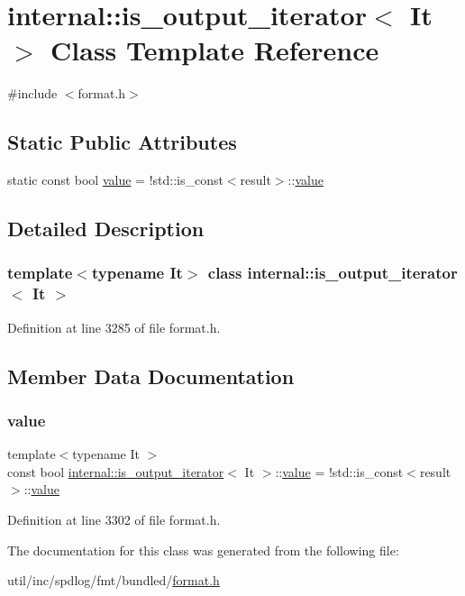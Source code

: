 \hypertarget{classinternal_1_1is__output__iterator}{}\section{internal\+:\+:is\+\_\+output\+\_\+iterator$<$ It $>$ Class Template Reference}
\label{classinternal_1_1is__output__iterator}


{\ttfamily \#include $<$format.\+h$>$}

\subsection*{Static Public Attributes}
\begin{DoxyCompactItemize}
\item 
static const bool \hyperlink{classinternal_1_1is__output__iterator_a2d666d72beb4bf14d00f2e5ecb1dd431}{value} = !std\+::is\+\_\+const$<$result$>$\+::\hyperlink{classinternal_1_1value}{value}
\end{DoxyCompactItemize}


\subsection{Detailed Description}
\subsubsection*{template$<$typename It$>$\newline
class internal\+::is\+\_\+output\+\_\+iterator$<$ It $>$}



Definition at line 3285 of file format.\+h.



\subsection{Member Data Documentation}
\mbox{\label{classinternal_1_1is__output__iterator_a2d666d72beb4bf14d00f2e5ecb1dd431}} 
\subsubsection{\texorpdfstring{value}{value}}
{\footnotesize\ttfamily template$<$typename It $>$ \\
const bool \hyperlink{classinternal_1_1is__output__iterator}{internal\+::is\+\_\+output\+\_\+iterator}$<$ It $>$\+::\hyperlink{classinternal_1_1value}{value} = !std\+::is\+\_\+const$<$result$>$\+::\hyperlink{classinternal_1_1value}{value}\hspace{0.3cm}{\ttfamily [static]}}



Definition at line 3302 of file format.\+h.



The documentation for this class was generated from the following file\+:\begin{DoxyCompactItemize}
\item 
util/inc/spdlog/fmt/bundled/\hyperlink{format_8h}{format.\+h}\end{DoxyCompactItemize}
